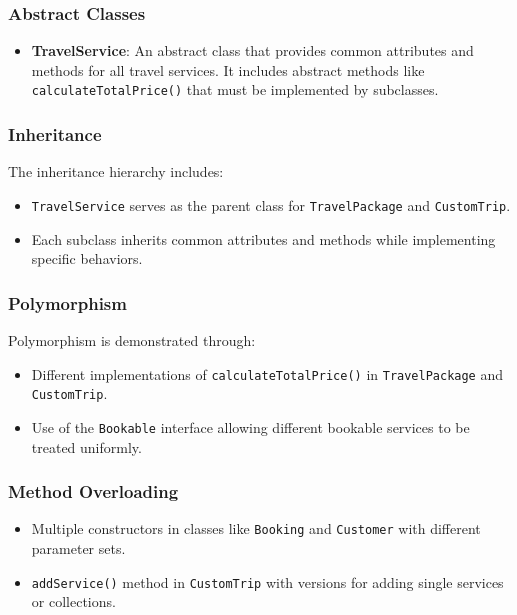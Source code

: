 \documentclass[12pt]{article}
\begin{document}
\subsubsection{Abstract Classes}
\begin{itemize}
    \item \textbf{TravelService}: An abstract class that provides common attributes and methods for all travel services. It includes abstract methods like \texttt{calculateTotalPrice()} that must be implemented by subclasses.
\end{itemize}

\subsubsection{Inheritance}
The inheritance hierarchy includes:
\begin{itemize}
    \item \texttt{TravelService} serves as the parent class for \texttt{TravelPackage} and \texttt{CustomTrip}.
    \item Each subclass inherits common attributes and methods while implementing specific behaviors.
\end{itemize}

\subsubsection{Polymorphism}
Polymorphism is demonstrated through:
\begin{itemize}
    \item Different implementations of \texttt{calculateTotalPrice()} in \texttt{TravelPackage} and \texttt{CustomTrip}.
    \item Use of the \texttt{Bookable} interface allowing different bookable services to be treated uniformly.
\end{itemize}

\subsubsection{Method Overloading}
\begin{itemize}
    \item Multiple constructors in classes like \texttt{Booking} and \texttt{Customer} with different parameter sets.
    \item \texttt{addService()} method in \texttt{CustomTrip} with versions for adding single services or collections.
\end{itemize}
\end{document}
